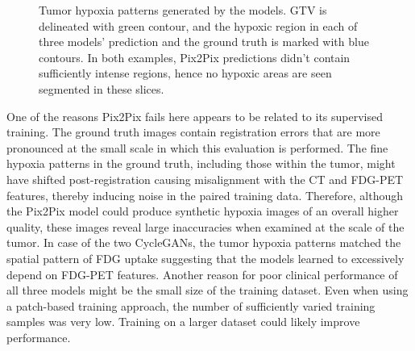 \begin{figure}[h!]
    \centering
    \caption{Tumor hypoxia patterns generated by the models. GTV is delineated with green contour, and the hypoxic region in each of three models' prediction and the ground truth is marked with blue contours. In both examples, Pix2Pix predictions didn't contain sufficiently intense regions, hence no hypoxic areas are seen segmented in these slices.}
    \label{fig:hypoxia_viz}
\end{figure}

One of the reasons Pix2Pix fails here appears to be related to its supervised training. The ground truth images contain registration errors that are more pronounced at the small scale in which this evaluation is performed. The fine hypoxia patterns in the ground truth, including those within the tumor, might have shifted post-registration causing misalignment with the CT and FDG-PET features, thereby inducing noise in the paired training data. Therefore, although the Pix2Pix model could produce synthetic hypoxia images of an overall higher quality, these images reveal large inaccuracies when examined at the scale of the tumor.
In case of the two CycleGANs, the tumor hypoxia patterns matched the spatial pattern of FDG uptake suggesting that the models learned to excessively depend on FDG-PET features. Another reason for poor clinical performance of all three models might be the small size of the training dataset. Even when using a patch-based training approach, the number of sufficiently varied training samples was very low. Training on a larger dataset could likely improve performance.
